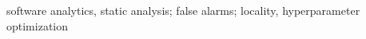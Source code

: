 \documentclass[compsoc,10pt]{IEEEtran}
\begin{document}
{\begin{abstract}

        

\end{abstract}



\begin{IEEEkeywords}
software analytics, static analysis; false alarms; locality,  hyperparameter optimization
\end{IEEEkeywords}}
\end{document}
